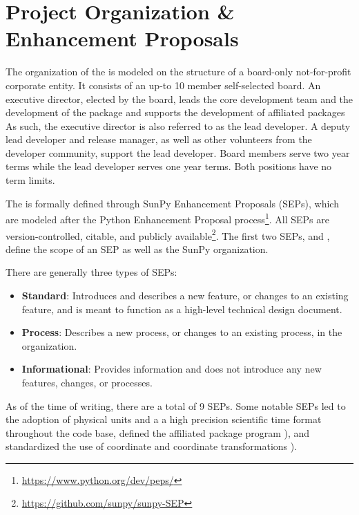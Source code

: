 \section{Project Organization \& Enhancement Proposals}
\label{sec:proj_org}

The organization of the \sunpyproj is modeled on the structure of a board-only not-for-profit corporate entity.
It consists of an up-to 10 member self-selected board.
An executive director, elected by the board, leads the core development team and the development of the \sunpypkg  package and supports the development of affiliated packages
As such, the executive director is also referred to as the lead developer.
A deputy lead developer and release manager, as well as other volunteers from the developer community, support the lead developer.
Board members serve two year terms while the lead developer serves one year terms. Both positions have no term limits.

The \sunpyproj is formally defined through SunPy Enhancement Proposals (SEPs), which are modeled after the Python Enhancement Proposal process\footnote{\url{https://www.python.org/dev/peps/}}.
All SEPs are version-controlled, citable, and publicly available\footnote{\url{https://github.com/sunpy/sunpy-SEP}}.
The first two SEPs, \citet[SEP-0001]{sep-0001} and \citet[SEP-0002]{sep-0002}, define the scope of an SEP as well as the SunPy organization.

There are generally three types of SEPs:
\begin{itemize}
    \item \textbf{Standard}: Introduces and describes a new feature, or changes to an existing feature, and is meant to function as a high-level technical design document.
    \item \textbf{Process}: Describes a new process, or changes to an existing process, in the organization.
    \item \textbf{Informational}: Provides information and does not introduce any new features, changes, or processes.
\end{itemize}

As of the time of writing, there are a total of 9 SEPs.
Some notable SEPs led to the adoption of physical units \citep[SEP-0003][see Section~\ref{sec:units}]{sep-0003} and a a high precision scientific time format \citep[SEP-0008][see Section~\ref{sec:units}]{sep-0008} throughout the code base, defined the affiliated package program \citep[SEP-0004][see Section~\ref{sec:affil_package}]{sep-0004}), and standardized the use of coordinate and coordinate transformations \citep[SEP-0005][see Section~\ref{sec:coords}]{sep-0005}).
